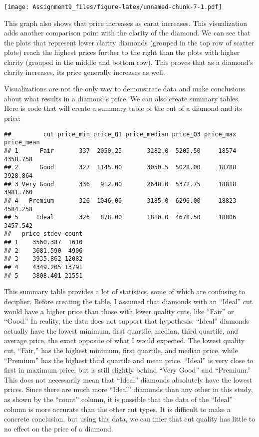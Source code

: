 \documentclass[
]{article}
\begin{document}
\texttt{[image: Assignment9\_files/figure-latex/unnamed-chunk-7-1.pdf]}

This graph also shows that price increases as carat increases. This
visualization adds another comparison point with the clarity of the
diamond. We can see that the plots that represent lower clarity diamonds
(grouped in the top row of scatter plots) reach the highest prices
further to the right than the plots with higher clarity (grouped in the
middle and bottom row). This proves that as a diamond's clarity
increases, its price generally increases as well.

Visualizations are not the only way to demonstrate data and make
conclusions about what results in a diamond's price. We can also create
summary tables. Here is code that will create a summary table of the cut
of a diamond and its price:

\begin{verbatim}
##         cut price_min price_Q1 price_median price_Q3 price_max price_mean
## 1      Fair       337  2050.25       3282.0  5205.50     18574   4358.758
## 2      Good       327  1145.00       3050.5  5028.00     18788   3928.864
## 3 Very Good       336   912.00       2648.0  5372.75     18818   3981.760
## 4   Premium       326  1046.00       3185.0  6296.00     18823   4584.258
## 5     Ideal       326   878.00       1810.0  4678.50     18806   3457.542
##   price_stdev count
## 1    3560.387  1610
## 2    3681.590  4906
## 3    3935.862 12082
## 4    4349.205 13791
## 5    3808.401 21551
\end{verbatim}

This summary table provides a lot of statistics, some of which are
confusing to decipher. Before creating the table, I assumed that
diamonds with an ``Ideal'' cut would have a higher price than those with
lower quality cuts, like ``Fair'' or ``Good.'' In reality, the data does
not support that hypothesis. ``Ideal'' diamonds actually have the lowest
minimum, first quartile, median, third quartile, and average price, the
exact opposite of what I would expected. The lowest quality cut,
``Fair,'' has the highest minimum, first quartile, and median price,
while ``Premium'' has the highest third quartile and mean price.
``Ideal'' is very close to first in maximum price, but is still slightly
behind ``Very Good'' and ``Premium.'' This does not necessarily mean
that ``Ideal'' diamonds absolutely have the lowest prices. Since there
are much more ``Ideal'' diamonds than any other in this study, as shown
by the ``count'' column, it is possible that the data of the ``Ideal''
column is more accurate than the other cut types. It is difficult to
make a concrete conclusion, but using this data, we can infer that cut
quality has little to no effect on the price of a diamond.
\end{document}

